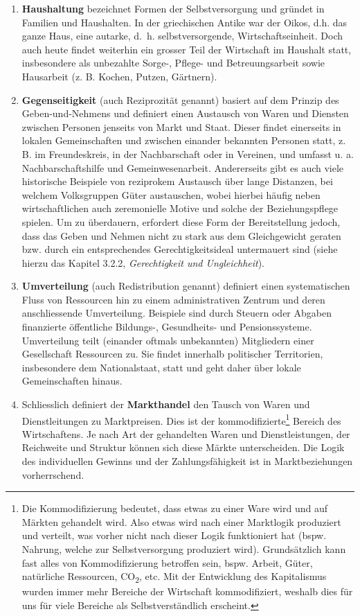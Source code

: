 \documentclass[
  nswissgerman,
  a4paper,
  DIV=11,
  numbers=noendperiod,
  oneside,
  openany]{scrreprt}
\begin{document}
\begin{enumerate}
\def\labelenumi{(\arabic{enumi})}
\item
  \textbf{Haushaltung} bezeichnet Formen der Selbstversorgung und
  gründet in Familien und Haushalten. In der griechischen Antike war der
  Oikos, d.h. das ganze Haus, eine autarke, d.~h. selbstversorgende,
  Wirtschaftseinheit. Doch auch heute findet weiterhin ein grosser Teil
  der Wirtschaft im Haushalt statt, insbesondere als unbezahlte Sorge-,
  Pflege- und Betreuungsarbeit sowie Hausarbeit (z. B. Kochen, Putzen,
  Gärtnern).
\item
  \textbf{Gegenseitigkeit} (auch Reziprozität genannt) basiert auf dem
  Prinzip des Geben-und-Nehmens und definiert einen Austausch von Waren
  und Diensten zwischen Personen jenseits von Markt und Staat. Dieser
  findet einerseits in lokalen Gemeinschaften und zwischen einander
  bekannten Personen statt, z. B. im Freundeskreis, in der Nachbarschaft
  oder in Vereinen, und umfasst u. a. Nachbarschaftshilfe und
  Gemeinwesenarbeit. Andererseits gibt es auch viele historische
  Beispiele von reziprokem Austausch über lange Distanzen, bei welchem
  Volksgruppen Güter austauschen, wobei hierbei häufig neben
  wirtschaftlichen auch zeremonielle Motive und solche der
  Beziehungspflege spielen. Um zu überdauern, erfordert diese Form der
  Bereitstellung jedoch, dass das Geben und Nehmen nicht zu stark aus
  dem Gleichgewicht geraten bzw. durch ein entsprechendes
  Gerechtigkeitsideal untermauert sind (siehe hierzu das Kapitel 3.2.2,
  \emph{Gerechtigkeit und Ungleichheit}).
\item
  \textbf{Umverteilung} (auch Redistribution genannt) definiert einen
  systematischen Fluss von Ressourcen hin zu einem administrativen
  Zentrum und deren anschliessende Umverteilung. Beispiele sind durch
  Steuern oder Abgaben finanzierte öffentliche Bildungs-, Gesundheits-
  und Pensionssysteme. Umverteilung teilt (einander oftmals unbekannten)
  Mitgliedern einer Gesellschaft Ressourcen zu. Sie findet innerhalb
  politischer Territorien, insbesondere dem Nationalstaat, statt und
  geht daher über lokale Gemeinschaften hinaus.
\item
  Schliesslich definiert der \textbf{Markthandel} den Tausch von Waren
  und Dienstleitungen zu Marktpreisen. Dies ist der
  kommodifizierte\footnote{Die Kommodifizierung bedeutet, dass etwas zu
    einer Ware wird und auf Märkten gehandelt wird. Also etwas wird nach
    einer Marktlogik produziert und verteilt, was vorher nicht nach
    dieser Logik funktioniert hat (bspw. Nahrung, welche zur
    Selbstversorgung produziert wird). Grundsätzlich kann fast alles von
    Kommodifizierung betroffen sein, bspw. Arbeit, Güter, natürliche
    Ressourcen, CO\textsubscript{2}, etc. Mit der Entwicklung des
    Kapitalismus wurden immer mehr Bereiche der Wirtschaft
    kommodifiziert, weshalb dies für uns für viele Bereiche als
    Selbstverständlich erscheint.} Bereich des Wirtschaftens. Je nach
  Art der gehandelten Waren und Dienstleistungen, der Reichweite und
  Struktur können sich diese Märkte unterscheiden. Die Logik des
  individuellen Gewinns und der Zahlungsfähigkeit ist in
  Marktbeziehungen vorherrschend.
\end{enumerate}
\end{document}
